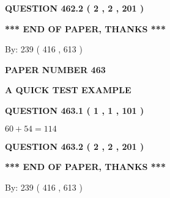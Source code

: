 \documentclass[12pt]{article}
\begin{document}
{\textbf{\Large{QUESTION
462.2 
 ( 2 , 2 , 201 )
}}}
  
  
   
   
 \vspace{0.2in}
 
   
   
   
   
\vspace{1.0in} 
{\textbf{\large{ *** END OF PAPER, THANKS *** }}} 
   
   
\hspace{1.0in} By: 
 239 ( 416 ,  613 )
   
   
   
   
\newpage 
\setcounter{page}{ 
   463001 } 
   
   
   
   
 {\textbf{ \Large{ PAPER NUMBER  463  }}}
   
   
\vspace{0.2in}
   
   
   
   
   
   
 \vspace{0.2in}
{\LARGE {\textbf{ A QUICK TEST EXAMPLE}}}
   
   
  
\vspace{0.2in}
  
{\textbf{\Large{QUESTION
463.1 
 ( 1 , 1 , 101 )
}}}
  
  
 
 

$ %
60 +  %
54=   %
114$
 
 
  
\vspace{0.2in}
  
{\textbf{\Large{QUESTION
463.2 
 ( 2 , 2 , 201 )
}}}
  
  
   
   
 \vspace{0.2in}
 
   
   
   
   
\vspace{1.0in} 
{\textbf{\large{ *** END OF PAPER, THANKS *** }}} 
   
   
\hspace{1.0in} By: 
 239 ( 416 ,  613 )
   
   
   
   
\newpage 
\setcounter{page}{ 
   464001 } 
   
\end{document}
